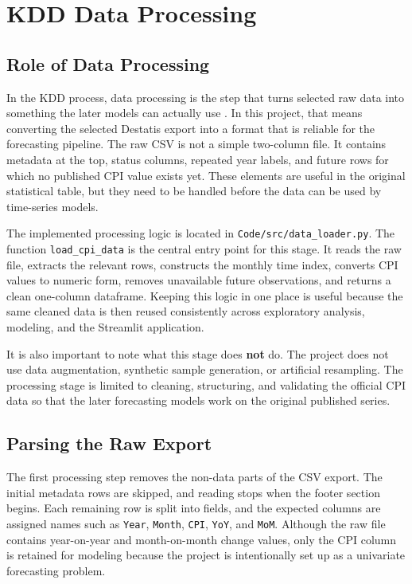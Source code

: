 %
%
%

\chapter{KDD Data Processing}
\label{ch:kdd-data-processing}

\section{Role of Data Processing}

In the KDD process, data processing is the step that turns selected raw data into something the later models can actually use \cite{Fayyad:1996}. In this project, that means converting the selected Destatis export into a format that is reliable for the forecasting pipeline. The raw CSV is not a simple two-column file. It contains metadata at the top, status columns, repeated year labels, and future rows for which no published CPI value exists yet. These elements are useful in the original statistical table, but they need to be handled before the data can be used by time-series models.

The implemented processing logic is located in \texttt{Code/src/data\_loader.py}. The function \texttt{load\_cpi\_data} is the central entry point for this stage. It reads the raw file, extracts the relevant rows, constructs the monthly time index, converts CPI values to numeric form, removes unavailable future observations, and returns a clean one-column dataframe. Keeping this logic in one place is useful because the same cleaned data is then reused consistently across exploratory analysis, modeling, and the Streamlit application.

It is also important to note what this stage does \textbf{not} do. The project does not use data augmentation, synthetic sample generation, or artificial resampling. The processing stage is limited to cleaning, structuring, and validating the official CPI data so that the later forecasting models work on the original published series.

\section{Parsing the Raw Export}

The first processing step removes the non-data parts of the CSV export. The initial metadata rows are skipped, and reading stops when the footer section begins. Each remaining row is split into fields, and the expected columns are assigned names such as \texttt{Year}, \texttt{Month}, \texttt{CPI}, \texttt{YoY}, and \texttt{MoM}. Although the raw file contains year-on-year and month-on-month change values, only the CPI column is retained for modeling because the project is intentionally set up as a univariate forecasting problem.

